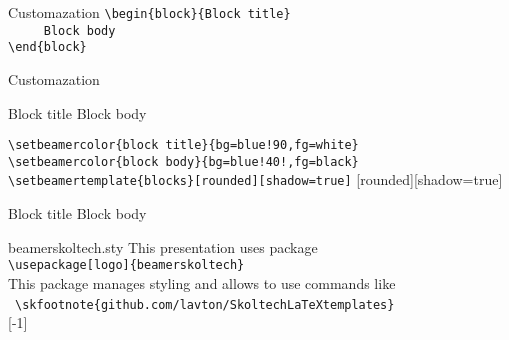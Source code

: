 \begin{frame}[t,fragile]{Customazation}
        \lstinline[basicstyle=\tt]|\begin{block}{Block title}|  \\
        \lstinline[basicstyle=\tt]|     Block body|  \\
        \lstinline[basicstyle=\tt]|\end{block}| \\
\end{frame}

\begin{frame}[t,fragile]{Customazation}
        \begin{block}{Block title}
            Block body
        \end{block}
    \pause\vspace{5mm}
    \lstinline[basicstyle=\tt]|\setbeamercolor{block title}{bg=blue!90,fg=white}|
    \lstinline[basicstyle=\tt]|\setbeamercolor{block body}{bg=blue!40!,fg=black}|
    \lstinline[basicstyle=\tt]|\setbeamertemplate{blocks}[rounded][shadow=true]|
    [rounded][shadow=true]
    \pause
    \begin{block}{Block title}
          Block body
    \end{block}
\end{frame}

\begin{frame}[fragile]{beamerskoltech.sty}
    This presentation uses package \\
    \lstinline[basicstyle=\tt]|\usepackage[logo]{beamerskoltech}|\\
    \pause
    This package manages styling and allows to use commands like \
    \lstinline[basicstyle=\tt]|\skfootnote{github.com/lavton/SkoltechLaTeXtemplates}|\\
    [-1]
\end{frame}

